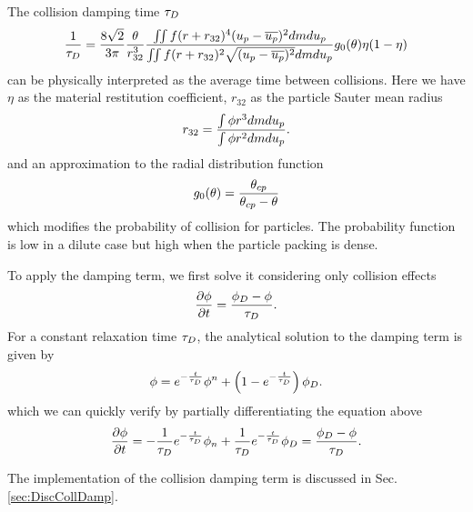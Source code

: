 
The collision damping time $\tau_D$
\begin{equation}
\label{eq:DampingTimeD}
\dfrac{1}{\sd} = \dfrac{8 \sqrt{2}}{3 \pi} \dfrac{\pvf}{r_{32}^3} \dfrac{\MultiIntegral{2} f (r+ r_{32})^4 (\up - \overline{\up})^2 d \m d \up}{\MultiIntegral{2} f (r + r_{32})^2 \sqrt{(\up - \overline{\up})^2}d \m d \up} g_0(\pvf) \eta (1-\eta)
\end{equation}
can be physically interpreted as the average time between collisions.
Here we have $\eta$ as the material restitution coefficient, $r_{32}$ as the particle Sauter mean radius
\begin{equation*}
    r_{32} = \dfrac{\int \phi r^3 dm d u_p}{\int \phi r^2 dm du_p}.
\end{equation*}
and an approximation to the radial distribution function
\begin{equation*}
    g_0 ( \theta ) = \dfrac{\theta_{cp}}{\theta_{cp} - \theta}
\end{equation*}
which modifies the probability of collision for particles.
The probability function is low in a dilute case but high when the particle packing is dense.


To apply the damping term, we first solve it considering only collision effects
\begin{equation*}
    \dfrac{\partial \phi}{\partial t} = \dfrac{\phi_D -\phi}{\tau_D}.
\end{equation*}
For a constant relaxation time $\tau_D$, the analytical solution to the damping term is given by
\begin{equation}
    \label{eq:BGKanalytical}
    \phi = e^{-\frac{t}{\tau_D}} \phi^n + \left(1-e^{- \frac{t}{\tau_D}} \right) \phi_{D}.
\end{equation}
which we can quickly verify by partially differentiating the equation above
\begin{equation}
    \dfrac{\partial \phi}{\partial t} = - \dfrac{1}{\tau_D} e^{- \frac{t}{\tau_D}} \phi_n + \dfrac{1}{\tau_D} e^{- \frac{t}{\tau_D}} \phi_D = \dfrac{\phi_D - \phi}{\tau_D}.
\end{equation}

The implementation of the collision damping term is discussed in Sec. \ref{sec:DiscCollDamp}.



